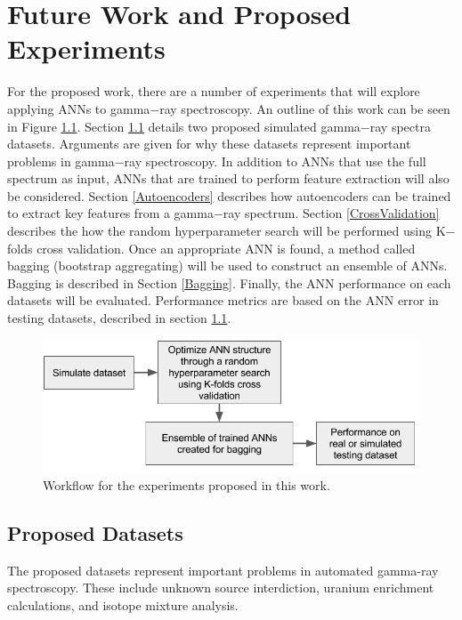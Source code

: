 \documentclass[tocnosub,noragright,centerchapter,12pt,fullpage]{uiucecethesis09}
\begin{document}
\chapter{Future Work and Proposed Experiments}

For the proposed work, there are a number of experiments that will explore applying ANNs to gamma$-$ray spectroscopy. An outline of this work can be seen in Figure \ref{fig:ANN_workflow}. Section \ref{ProposedDatasets} details two proposed simulated gamma$-$ray spectra datasets. Arguments are given for why these datasets represent important problems in gamma$-$ray spectroscopy. In addition to ANNs that use the full spectrum as input, ANNs that are trained to perform feature extraction will also be considered. Section \ref{Autoencoders} describes how autoencoders can be trained to extract key features from a gamma$-$ray spectrum. Section \ref{CrossValidation} describes the how the random hyperparameter search will be performed using K$-$folds cross validation. Once an appropriate ANN is found, a method called bagging (bootstrap aggregating) will be used to construct an ensemble of ANNs. Bagging is described in Section \ref{Bagging}. Finally, the ANN performance on each datasets will be evaluated. Performance metrics are based on the ANN error in testing datasets, described in section \ref{ProposedDatasets}.%




\begin{figure}[H]
\centering
\includegraphics[width=0.8\linewidth]{images/ANN_workflow}
\caption{Workflow for the experiments proposed in this work.}
\label{fig:ANN_workflow}
\end{figure}



\section{Proposed Datasets} \label{ProposedDatasets}

The proposed datasets represent important problems in automated gamma-ray spectroscopy. These include unknown source interdiction, uranium enrichment calculations, and isotope mixture analysis. 
\end{document}
